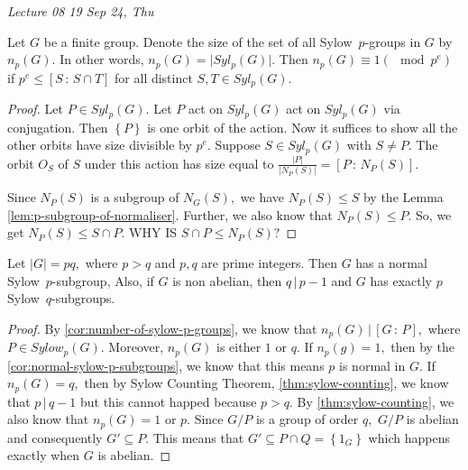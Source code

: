 \noindent
\emph{Lecture 08 \hfill 19 Sep 24, Thu}

\begin{theorem}
Let $G$ be a finite group. Denote the size of the set of all Sylow~$p$\nobreakdash-groups
in $G$ by $n_p(G).$ In other words, $n_p(G) =  \lvert Syl_p(G) \rvert.$ Then $ n_p(G) \equiv
1 (\mod p^e) $ if $ p^e \leq \left[ S \, : \, S \cap T \right] $ for all distinct $ S,T
\in Syl_p(G). $
\end{theorem}

\begin{proof}
	Let $P \in Syl_p(G) .$ Let $P$ act on $Syl_p(G)$ act on $Syl_p(G)$ via 
	conjugation. Then $ \left\{ P \right\} $ is one orbit of the action.
	Now it suffices to show all the other orbits have size divisible by $p^e.$
	Suppose $S \in Syl_p(G) $ with $S \not = P.$ The orbit $O_S$ of $S$ under this action
	has size equal to $ \frac{ \lvert P \rvert}{ \lvert N_P(S) \rvert}  = \left[ P
	\, : \, N_P(S) \right] .$

	Since $N_P(S) $ is a subgroup of $N_G(S),$ we have $N_P(S) \leq S $ by the
	Lemma \ref{lem:p-subgroup-of-normaliser}. Further, we also know that $ N_P(S) 
	\leq P. $ So, we get $N_P(S) \leq S \cap P.$ WHY IS $ S \cap P \leq N_P(S) ? $

\end{proof}

\begin{theorem}
	Let $ \lvert G \rvert = pq, $ where $p > q$ and $p, q$ are prime integers.
	Then $G$ has a normal Sylow~$p$\nobreakdash-subgroup, Also, if $G$ is non abelian,
	then $q \, | \, p-1 $ and $G$ has exactly $p$ Sylow~$q$\nobreakdash-subgroups.	
\end{theorem}

\begin{proof}
	By \cref{cor:number-of-sylow-p-groups}, we know that $n_p(G) \, | \, \left[ G
	\, : \, P\right] ,$ where $P \in Sylow_p(G).$ Moreover, $n_p(G)$ is either $1$
	or $q.$ If $n_p(g) = 1,$ then by the \cref{cor:normal-sylow-p-subgroups}, we
	know that this means $p$ is normal in $G.$ If $n_p(G) = q,$ then by Sylow Counting
	Theorem, \cref{thm:sylow-counting}, we know that $p \, | \, q-1$ but this cannot
	happed because $ p > q.$ By \cref{thm:sylow-counting}, we also know that
	$n_p(G) = 1$ or $p.$ Since $ G / P$ is a group of order $q,$ $G / P$ is abelian and
	consequently $G ' \subseteq P.$ This means that $ G' \subseteq P \cap Q = \left\{ 
	1_G \right\} $ which happens exactly when $ G$ is abelian.
\end{proof}

